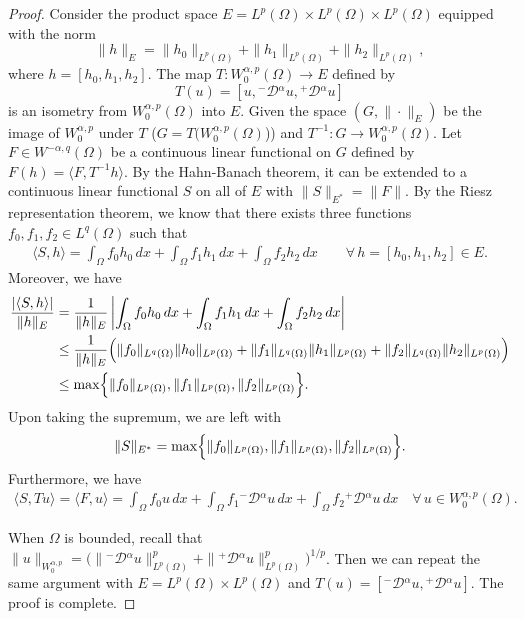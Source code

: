 \documentclass[leqno,final]{siamltex}
\numberwithin{equation}{section}
\renewcommand{\(}{\bigl(}
\renewcommand{\)}{\bigr)}
\begin{document}
   \begin{proof}
   Consider the product space $E = L^{p}(\Omega) \times L^{p}(\Omega) \times L^{p}(\Omega)$ equipped with the norm 
  \[
  \|h\|_{E} = \|h_0\|_{L^{p}(\Omega)} + \|h_1\|_{L^{p}(\Omega)} + \| h_2\|_{L^{p}(\Omega)},
  \]
   where $h = [ h_0 , h_1 , h_2]$. The map $T: W^{\alpha , p}_{0}(\Omega) \rightarrow E$ 
   defined by 
   \[
   T(u) = [u, {^{-}}{\mathcal{D}}{^{\alpha}} u , {^{+}}{\mathcal{D}}{^{\alpha}} u]
   \]
   is an isometry from $W^{\alpha , p }_{0}(\Omega)$ into $E$. Given the space 
   $(G, \|\cdot\|_{E})$ be the image of $W^{\alpha,p}_{0}$ under $T$ 
   ($G= T(W^{\alpha,p}_{0}(\Omega)$)) and $T^{-1} : G \rightarrow W^{\alpha,p}_{0}(\Omega)$. 
   Let $F \in W^{-\alpha ,q}(\Omega)$ be a continuous linear functional on $G$ defined by 
   $F(h) = \langle F, T^{-1} h\rangle$. By the Hahn-Banach theorem, it can be extended to 
   a continuous linear functional $S$ on all of $E$ with $\|S\|_{E^{*}} = \|F\|$. 
   By the Riesz representation theorem, we know that there exists three functions 
   $f_0 , f_1 , f_2 \in L^{q}(\Omega)$ such that 
   \begin{align*}
       \langle S, h\rangle = \int_{\Omega} f_0 h_0 \, dx + \int_{\Omega} f_1 h_1\, dx + \int_{\Omega} f_2 h_2\, dx \qquad \forall \, h = [h_0 , h_1 , h_2] \in E.
   \end{align*}
   Moreover, we have 
   \begin{align*}
       \dfrac{|\langle S , h \rangle |}{\|h\|_{E}} &= \dfrac{1}{\|h\|_{E}}\left| \int_{\Omega} f_0 h_0\, dx + \int_{\Omega} f_1 h_1 \, dx + \int_{\Omega} f_2 h_2 \, dx \right| \\ 
       &\leq \dfrac{1}{\|h\|_{E}} \Bigl( \|f_{0}\|_{L^{q}(\Omega)} \| h_0 \|_{L^{p}(\Omega)} + \|f_{1}\|_{L^{q}(\Omega)} \|h_1\|_{L^{p}(\Omega)} + \|f_2\|_{L^{q}(\Omega)} \|h_2\|_{L^{p}(\Omega)} \Bigr)\\
       &\leq \max \Bigl\{ \|f_0\|_{L^{p}(\Omega)}, \|f_1\|_{L^{p}(\Omega)} , \|f_2\|_{L^{p}(\Omega)} \Bigr\}.
   \end{align*} 
   Upon taking the supremum, we are left with 
   \[ 
   \|S\|_{E^{*}} = \max \Bigl\{ \|f_0\|_{L^{p}(\Omega)}, \|f_1\|_{L^{p}(\Omega)} ,
    \|f_2\|_{L^{p}(\Omega)} \Bigr\}.
   \]
   Furthermore, we have 
   \begin{align*}
       \langle S , Tu \rangle = \langle F, u \rangle = \int_{\Omega} f_0 u\, dx + \int_{\Omega} f_1 {^{-}}{\mathcal{D}}{^{\alpha}} u \, dx + \int_{\Omega} f_2 {^{+}}{\mathcal{D}}{^{\alpha}} u\, dx \quad \forall\, u \in W^{\alpha, p}_{0}(\Omega).
   \end{align*}
   
   When $\Omega$ is bounded, recall that $\|u \|_{W^{\alpha,p}_{0}} = \bigl(\|{^{-}}{\mathcal{D}}{^{\alpha}} u \|_{L^{p}(\Omega)}^{p} + \| {^{+}}{\mathcal{D}}{^{\alpha}} u \|_{L^{p}(\Omega)}^{p} \bigr)^{1/p}$. 
   Then we can repeat the same argument with $E = L^{p}(\Omega) \times L^{p}(\Omega)$ and $T(u) = [ {^{-}}{\mathcal{D}}{^{\alpha}} u , {^{+}}{\mathcal{D}}{^{\alpha}} u ]$. The proof is complete.
   \end{proof}
   
\end{document}
